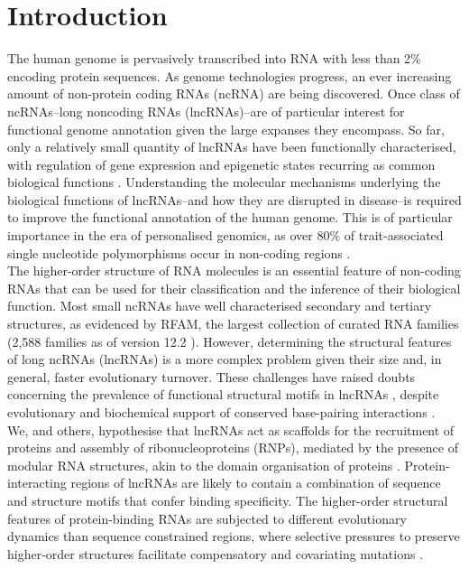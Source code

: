 \documentclass[a4paper,11pt]{article}
\begin{document}
\section{Introduction}
The human genome is pervasively transcribed into RNA with less than 2\%
encoding protein sequences. As genome technologies progress, an ever 
increasing amount of non-protein coding RNAs (ncRNA) are being discovered.
Once class of ncRNAs--long noncoding RNAs (lncRNAs)--are of particular 
interest for functional genome annotation given the large expanses they encompass. 
So far, only a relatively small quantity of lncRNAs have been functionally characterised, 
with regulation of gene expression and epigenetic states recurring as common 
biological functions \cite{morris2014rise,engreitz2016long}. 
Understanding the molecular mechanisms underlying the biological functions of 
lncRNAs--and how they are disrupted in disease--is required to improve 
the functional annotation of the human genome. This is of
particular importance in the era of personalised genomics, as over 80\% of 
trait-associated single nucleotide polymorphisms occur in  non-coding regions 
\cite{hindorff2009potential,ritchie2014functional}.\\

The higher-order structure of RNA molecules is an essential feature of
non-coding RNAs that can be used for their classification and 
the inference of their biological function. Most small ncRNAs have well 
characterised secondary and tertiary structures, as evidenced by  RFAM, 
the largest collection of curated RNA families (2,588 families as of version 
12.2 \cite{rfam12}). However, determining the structural features of 
 long ncRNAs (lncRNAs) is a more complex problem given their
 size and, in general, faster evolutionary turnover. These challenges
 have raised doubts concerning the prevalence of functional structural 
 motifs in lncRNAs \cite{eddy2014computational,rivas2016statistical}, 
 despite evolutionary and biochemical support of conserved base-pairing 
 interactions \cite{smith2013widespread,spitale2015structural,lu2016rna}.\\

We, and others, hypothesise that lncRNAs act as scaffolds for the 
recruitment of proteins and assembly of ribonucleoproteins (RNPs), 
mediated by the presence of modular RNA structures, akin to the 
domain organisation of proteins 
\cite{zappulla2006rna,hogg2008structured,rinn2012genome,mercer2013structure,smith2013widespread,chujo2016architectural,blythe2016ins}. 
Protein-interacting regions of lncRNAs are likely to contain a combination 
of sequence and structure motifs that confer binding specificity. 
The higher-order structural features of protein-binding RNAs are 
subjected to different evolutionary dynamics than sequence constrained 
regions, where selective pressures to preserve higher-order 
structures facilitate compensatory and covariating mutations 
\cite{pang2006rapid,smith2013widespread,johnsson2014evolutionary}.\\
  
\end{document}
